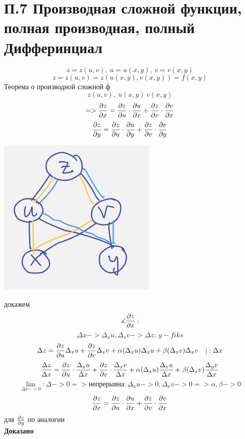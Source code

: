 \documentclass{article}
\begin{document}
\section{П.7 Производная сложной функции, полная производная, полный Дифферинциал}
\begin{equation}
    z = z(u,v),\ u = u(x, y),\ v = v(x,y)
\end{equation}
\begin{equation}
    z = z(u, v)= z(u(x,y), v(x,y)) = f(x,y)
\end{equation}
Теорема о производной сложной ф
\begin{equation}
    z(u,v),\ u(x,y)\ v(x,y)
\end{equation}
\begin{equation}
    => \pdv{z}{x} = \pdv{z}{u}\cdot \pdv{u}{x} + \pdv{z}{v}\cdot \pdv{v}{x}
\end{equation}
\begin{equation}
     \pdv{z}{y} = \pdv{z}{u}\cdot \pdv{u}{y} + \pdv{z}{v}\cdot \pdv{v}{y}
\end{equation}
\begin{center}
    \includegraphics[width=.3\textwidth]{graphF.png} 
\end{center}
докажем
\begin{equation}
    \measuredangle \pdv{z}{x}:
\end{equation}
\begin{equation}
    \Delta x -> \Delta_x u, \Delta_x v-> \Delta z;\ y -fiks
\end{equation}
\begin{equation}
    \Delta z= \pdv{z}{u}\Delta_x u +\pdv{z}{v}\Delta_xv+\alpha(\Delta_xu)\Delta_xu+\beta(\Delta_xv)\Delta_xv\ \ \ |:\Delta x
\end{equation}
\begin{equation}
    \frac{\Delta z}{\Delta x} = \pdv{z}{u}\cdot \frac{\Delta_x u}{\Delta x}+\pdv{z}{v}\cdot\frac{\Delta_xv}{\Delta x}+ \alpha(\Delta_x u)\frac{\Delta_xu}{\Delta x} +\beta(\Delta_xv)\frac{\Delta_yv}{\Delta x}
\end{equation}
\begin{equation}
    \lim_{\Delta x->0}: \Delta -> 0 => \text{непрерывна}: \Delta_xu -> 0, \Delta_xv -> 0 => \alpha, \beta -> 0
\end{equation}
\begin{equation}
    \pdv{z}{x} = \pdv{z}{u} \cdot \pdv{u}{x} + \pdv{z}{v}\cdot \pdv{v}{x}
\end{equation}
для $\pdv{z}{y}$ по аналогии\\
\textbf{Доказано}
\end{document}
